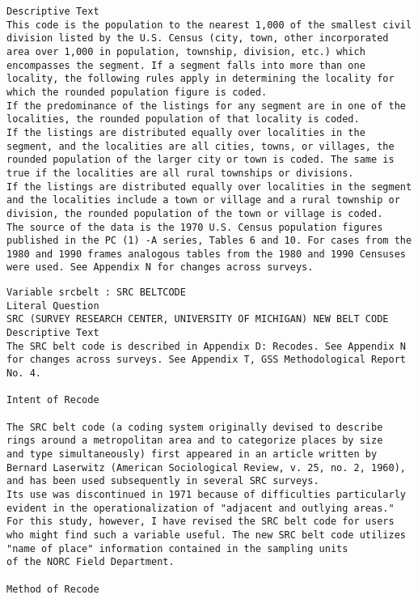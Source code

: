 \documentclass[10pt, letterpaper]{article}
\begin{document}
\begin{spacing}{2.0}
{\begin{verbatim}
Descriptive Text
This code is the population to the nearest 1,000 of the smallest civil
division listed by the U.S. Census (city, town, other incorporated
area over 1,000 in population, township, division, etc.) which
encompasses the segment. If a segment falls into more than one
locality, the following rules apply in determining the locality for
which the rounded population figure is coded.
If the predominance of the listings for any segment are in one of the
localities, the rounded population of that locality is coded.
If the listings are distributed equally over localities in the
segment, and the localities are all cities, towns, or villages, the
rounded population of the larger city or town is coded. The same is
true if the localities are all rural townships or divisions.
If the listings are distributed equally over localities in the segment
and the localities include a town or village and a rural township or
division, the rounded population of the town or village is coded.
The source of the data is the 1970 U.S. Census population figures
published in the PC (1) -A series, Tables 6 and 10. For cases from the
1980 and 1990 frames analogous tables from the 1980 and 1990 Censuses
were used. See Appendix N for changes across surveys.

\end{verbatim}

\begin{verbatim}
Variable srcbelt : SRC BELTCODE
Literal Question
SRC (SURVEY RESEARCH CENTER, UNIVERSITY OF MICHIGAN) NEW BELT CODE
Descriptive Text
The SRC belt code is described in Appendix D: Recodes. See Appendix N
for changes across surveys. See Appendix T, GSS Methodological Report
No. 4.

Intent of Recode

The SRC belt code (a coding system originally devised to describe
rings around a metropolitan area and to categorize places by size
and type simultaneously) first appeared in an article written by
Bernard Laserwitz (American Sociological Review, v. 25, no. 2, 1960),
and has been used subsequently in several SRC surveys.
Its use was discontinued in 1971 because of difficulties particularly
evident in the operationalization of "adjacent and outlying areas."
For this study, however, I have revised the SRC belt code for users
who might find such a variable useful. The new SRC belt code utilizes
"name of place" information contained in the sampling units
of the NORC Field Department.

Method of Recode


\end{verbatim}}
\end{spacing}
\end{document}
